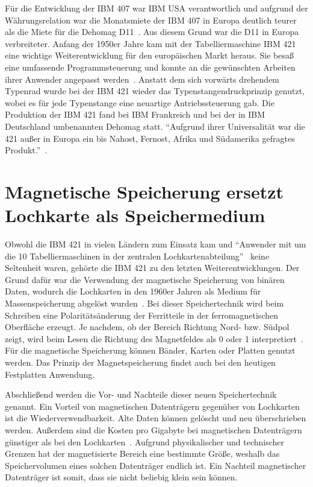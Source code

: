 \documentclass[parskip=half]{scrartcl}
\begin{document}
Für die Entwicklung der IBM 407 war IBM USA verantwortlich und aufgrund der
Währungsrelation war die Monatsmiete der IBM 407 in Europa deutlich teurer als
die Miete für die Dehomag D11~\cite{sandner}. Aus diesem Grund war
die D11 in Europa verbreiteter. Anfang der 1950er Jahre kam mit der
Tabelliermaschine IBM 421 eine wichtige Weiterentwicklung für den europäischen
Markt heraus. Sie besaß eine umfassende Programmsteuerung und konnte an die
gewünschten Arbeiten ihrer Anwender angepasst werden~\cite{deutschesMuseum}.
Anstatt dem sich vorwärts drehendem Typenrad wurde bei der IBM 421 wieder das
Typenstangendruckprinzip genutzt, wobei es für jede Typenstange eine neuartige
Antriebssteuerung gab. Die Produktion der IBM 421 fand bei IBM Frankreich und
bei der in IBM Deutschland umbenannten Dehomag statt. \enquote{Aufgrund ihrer
Universalität war die 421 außer in Europa ein bis Nahost, Fernost, Afrika und
Südamerika gefragtes Produkt.}~\cite{sandner}.

\section{Magnetische Speicherung ersetzt Lochkarte als Speichermedium}

Obwohl die IBM 421 in vielen Ländern zum Einsatz kam und \enquote{Anwender mit um die
10 Tabelliermaschinen in der zentralen Lochkartenabteilung}~\cite{sandner} keine Seltenheit waren, gehörte die IBM 421 zu den letzten
Weiterentwicklungen. Der Grund dafür war die Verwendung der magnetische
Speicherung von binären Daten, wodurch die Lochkarten in den 1960er Jahren als
Medium für Massenspeicherung abgelöst wurden~\cite{gronau2009}. Bei
dieser Speichertechnik wird beim Schreiben eine Polaritätsänderung der
Ferritteile in der  ferromagnetischen Oberfläche erzeugt. Je nachdem, ob der
Bereich Richtung Nord- bzw. Südpol zeigt, wird beim Lesen die Richtung des
Magnetfeldes als 0 oder 1 interpretiert~\cite{gronau2009}. Für die
magnetische Speicherung können Bänder, Karten oder Platten genutzt werden. Das
Prinzip der Magnetspeicherung findet auch bei den heutigen Festplatten
Anwendung.

Abschließend werden die Vor- und Nachteile dieser neuen Speichertechnik
genannt. Ein Vorteil von magnetischen Datenträgern gegenüber von Lochkarten ist
die Wiederverwendbarkeit. Alte Daten können gelöscht und neu überschrieben
werden. Außerdem sind die Kosten pro Gigabyte bei magnetischen Datenträgern
günstiger als bei den Lochkarten~\cite{Dee}. Aufgrund physikalischer und
technischer Grenzen hat der magnetisierte Bereich eine bestimmte Größe, weshalb
das Speichervolumen eines solchen Datenträger endlich ist. Ein Nachteil
magnetischer Datenträger ist somit, dass sie nicht beliebig klein sein können.
\end{document}
